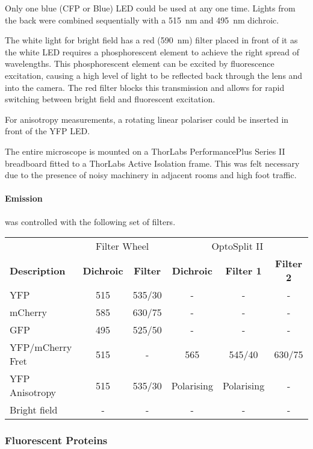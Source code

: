 \documentclass[../main.tex]{subfiles}
\begin{document}
Only one blue (CFP or Blue) LED could be used at any one time. Lights from the back were combined sequentially with a \SI{515}{\nano\meter} and \SI{495}{\nano\meter} dichroic.

The white light for bright field has a red (\SI{590}{\nano\meter}) filter placed in front of it as the white LED requires a phosphorescent element to achieve the right spread of wavelengths. This phosphorescent element can be excited by fluorescence excitation, causing a high level of light to be reflected back through the lens and into the camera. The red filter blocks this transmission and allows for rapid switching between bright field and fluorescent excitation.

For anisotropy measurements, a rotating linear polariser could be inserted in front of the YFP LED.

The entire microscope is mounted on a ThorLabs PerformancePlus Series II breadboard fitted to a ThorLabs Active Isolation frame. This was felt necessary due to the presence of noisy machinery in adjacent rooms and high foot traffic.

\paragraph{Emission} was controlled with the following set of filters.
\begin{center}
\begin{tabular}{l|c|c|c|c|c}
&	\multicolumn{2}{c|}{Filter Wheel}	&	\multicolumn{3}{c}{OptoSplit II}	\\
\textbf{Description}	&	\textbf{Dichroic}	&	\textbf{Filter}		& \textbf{Dichroic}	&	\textbf{Filter 1}	&	\textbf{Filter 2}	\\\hline
YFP		&	515		&	535/30	&	-	&	-	&	-	\\
mCherry	&	585		&	630/75	&	-	&	-	&	-	\\
GFP		&	495		&	525/50	&	-	&	-	&	-	\\
YFP/mCherry Fret	&	515	&	-	&	565	&	545/40	&	630/75	\\
YFP Anisotropy	&	515	&	535/30	&	Polarising	&	Polarising	&	-	\\
Bright field		&	-	&	-	&	-	&	-	&	-	
\end{tabular}
\end{center}


\subsubsection{Fluorescent Proteins}
\end{document}
